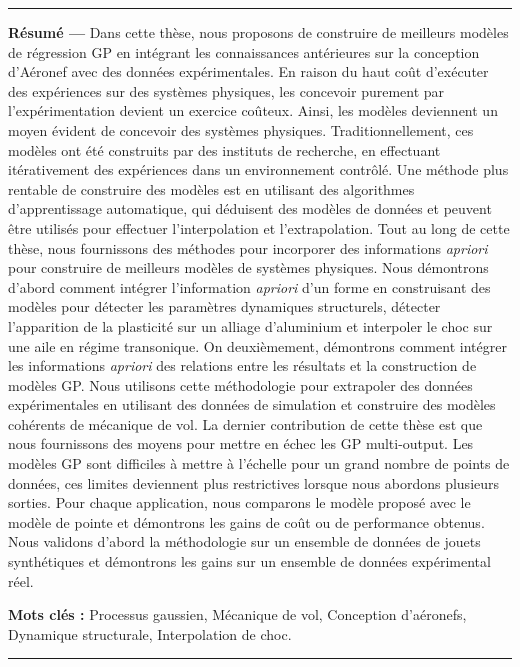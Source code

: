 \begin{vcenterpage}

\noindent\rule[2pt]{\textwidth}{0.5pt}

{\large\textbf{Résumé ---}}
   Dans cette thèse, nous proposons de construire de meilleurs modèles de régression GP en intégrant les connaissances antérieures sur la conception d'Aéronef avec des données expérimentales. En raison du haut coût d'exécuter des expériences sur des systèmes physiques, les concevoir purement par l'expérimentation devient un exercice coûteux. Ainsi, les modèles deviennent un moyen évident de concevoir des systèmes physiques. Traditionnellement, ces modèles ont été construits par des instituts de recherche, en effectuant itérativement des expériences dans un environnement contrôlé. Une méthode plus rentable de construire des modèles est en utilisant des algorithmes d'apprentissage automatique, qui déduisent des modèles de données et peuvent être utilisés pour effectuer l'interpolation et l'extrapolation. Tout au long de cette thèse, nous fournissons des méthodes pour incorporer des informations \textit{apriori} pour construire de meilleurs modèles de systèmes physiques. Nous démontrons d'abord comment intégrer l'information \textit{apriori} d'un forme en construisant des modèles pour détecter les paramètres dynamiques structurels, détecter l'apparition de la plasticité sur un alliage d'aluminium et interpoler le choc sur une aile en régime transonique. On deuxièmement, démontrons comment intégrer les informations \textit{apriori} des relations entre les résultats et la construction de modèles GP. Nous utilisons cette méthodologie pour extrapoler des données expérimentales en utilisant des données de simulation et construire des modèles cohérents de mécanique de vol. La dernier contribution de cette thèse est que nous fournissons des moyens pour mettre en échec les GP multi-output. Les modèles GP sont difficiles à mettre à l'échelle pour un grand nombre de points de données, ces limites deviennent plus restrictives lorsque nous abordons plusieurs sorties. Pour chaque application, nous comparons le modèle proposé avec le modèle de pointe et démontrons les gains de coût ou de performance obtenus. Nous validons d'abord la méthodologie sur un ensemble de données de jouets synthétiques et démontrons les gains sur un ensemble de données expérimental réel.

{\large\textbf{Mots clés :}}
    Processus gaussien, Mécanique de vol, Conception d'aéronefs, Dynamique structurale, Interpolation de choc.
\\
\noindent\rule[2pt]{\textwidth}{0.5pt}


\end{vcenterpage}
